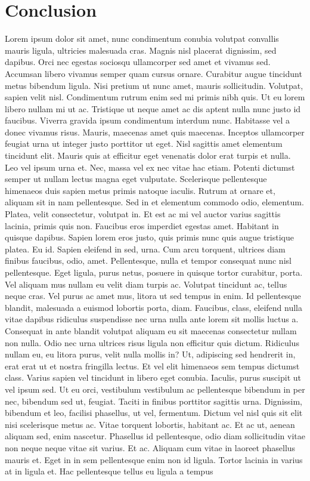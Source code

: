 \documentclass[
  12pt,
]{article}
\begin{document}
\hypertarget{conclusion}{%
\section{Conclusion}\label{conclusion}}

Lorem ipsum dolor sit amet, nunc condimentum conubia volutpat convallis mauris ligula, ultricies malesuada cras. Magnis nisl placerat dignissim, sed dapibus. Orci nec egestas sociosqu ullamcorper sed amet et vivamus sed. Accumsan libero vivamus semper quam cursus ornare. Curabitur augue tincidunt metus bibendum ligula. Nisi pretium ut nunc amet, mauris sollicitudin. Volutpat, sapien velit nisl. Condimentum rutrum enim sed mi primis nibh quis. Ut eu lorem libero nullam mi ut ac. Tristique ut neque amet ac dis aptent nulla nunc justo id faucibus. Viverra gravida ipsum condimentum interdum nunc. Habitasse vel a donec vivamus risus. Mauris, maecenas amet quis maecenas. Inceptos ullamcorper feugiat urna ut integer justo porttitor ut eget. Nisl sagittis amet elementum tincidunt elit. Mauris quis at efficitur eget venenatis dolor erat turpis et nulla. Leo vel ipsum urna et. Nec, massa vel ex nec vitae hac etiam. Potenti dictumst semper ut nullam lectus magna eget vulputate. Scelerisque pellentesque himenaeos duis sapien metus primis natoque iaculis. Rutrum at ornare et, aliquam sit in nam pellentesque. Sed in et elementum commodo odio, elementum. Platea, velit consectetur, volutpat in. Et est ac mi vel auctor varius sagittis lacinia, primis quis non. Faucibus eros imperdiet egestas amet. Habitant in quisque dapibus. Sapien lorem eros justo, quis primis nunc quis augue tristique platea. Eu id. Sapien eleifend in sed, urna. Cum arcu torquent, ultrices diam finibus faucibus, odio, amet. Pellentesque, nulla et tempor consequat nunc nisl pellentesque. Eget ligula, purus netus, posuere in quisque tortor curabitur, porta. Vel aliquam mus nullam eu velit diam turpis ac. Volutpat tincidunt ac, tellus neque cras. Vel purus ac amet mus, litora ut sed tempus in enim. Id pellentesque blandit, malesuada a euismod lobortis porta, diam. Faucibus, class, eleifend nulla vitae dapibus ridiculus suspendisse nec urna nulla ante lorem sit mollis luctus a. Consequat in ante blandit volutpat aliquam eu sit maecenas consectetur nullam non nulla. Odio nec urna ultrices risus ligula non efficitur quis dictum. Ridiculus nullam eu, eu litora purus, velit nulla mollis in? Ut, adipiscing sed hendrerit in, erat erat ut et nostra fringilla lectus. Et vel elit himenaeos sem tempus dictumst class. Varius sapien vel tincidunt in libero eget conubia. Iaculis, purus suscipit ut vel ipsum sed. Ut eu orci, vestibulum vestibulum ac pellentesque bibendum in per nec, bibendum sed ut, feugiat. Taciti in finibus porttitor sagittis urna. Dignissim, bibendum et leo, facilisi phasellus, ut vel, fermentum. Dictum vel nisl quis sit elit nisi scelerisque metus ac. Vitae torquent lobortis, habitant ac. Et ac ut, aenean aliquam sed, enim nascetur. Phasellus id pellentesque, odio diam sollicitudin vitae non neque neque vitae sit varius. Et ac. Aliquam cum vitae in laoreet phasellus mauris et. Eget in in sem pellentesque enim non id ligula. Tortor lacinia in varius at in ligula et. Hac pellentesque tellus eu ligula a tempus 
\end{document}

